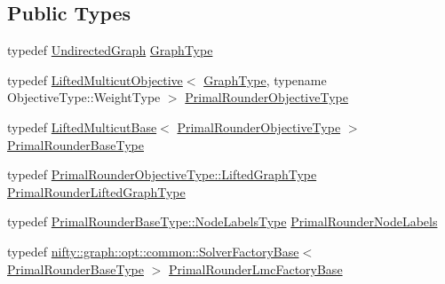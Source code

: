 \subsection*{Public Types}
\begin{DoxyCompactItemize}
\item 
typedef \hyperlink{classnifty_1_1graph_1_1UndirectedGraph}{Undirected\+Graph} \hyperlink{structnifty_1_1graph_1_1opt_1_1lifted__multicut_1_1LiftedMulticutMp_1_1LiftedRounder_ab554fdcb105127764221d744665a12fc}{Graph\+Type}
\item 
typedef \hyperlink{classnifty_1_1graph_1_1opt_1_1lifted__multicut_1_1LiftedMulticutObjective}{Lifted\+Multicut\+Objective}$<$ \hyperlink{structnifty_1_1graph_1_1opt_1_1lifted__multicut_1_1LiftedMulticutMp_1_1LiftedRounder_ab554fdcb105127764221d744665a12fc}{Graph\+Type}, typename Objective\+Type\+::\+Weight\+Type $>$ \hyperlink{structnifty_1_1graph_1_1opt_1_1lifted__multicut_1_1LiftedMulticutMp_1_1LiftedRounder_aba77dfcceab7f0a4a92e6875c9807605}{Primal\+Rounder\+Objective\+Type}
\item 
typedef \hyperlink{classnifty_1_1graph_1_1opt_1_1lifted__multicut_1_1LiftedMulticutBase}{Lifted\+Multicut\+Base}$<$ \hyperlink{structnifty_1_1graph_1_1opt_1_1lifted__multicut_1_1LiftedMulticutMp_1_1LiftedRounder_aba77dfcceab7f0a4a92e6875c9807605}{Primal\+Rounder\+Objective\+Type} $>$ \hyperlink{structnifty_1_1graph_1_1opt_1_1lifted__multicut_1_1LiftedMulticutMp_1_1LiftedRounder_a4f36e999999e10b1a2c4a78d724ee847}{Primal\+Rounder\+Base\+Type}
\item 
typedef \hyperlink{classnifty_1_1graph_1_1opt_1_1lifted__multicut_1_1LiftedMulticutObjective_aec5a5f52c2226c545ca883394fd95a9c}{Primal\+Rounder\+Objective\+Type\+::\+Lifted\+Graph\+Type} \hyperlink{structnifty_1_1graph_1_1opt_1_1lifted__multicut_1_1LiftedMulticutMp_1_1LiftedRounder_a38f30577dd1d5ec834fabb297cd97f70}{Primal\+Rounder\+Lifted\+Graph\+Type}
\item 
typedef \hyperlink{classnifty_1_1graph_1_1opt_1_1common_1_1SolverBase_abefd51561de2fd009f6bed6bef6009ea}{Primal\+Rounder\+Base\+Type\+::\+Node\+Labels\+Type} \hyperlink{structnifty_1_1graph_1_1opt_1_1lifted__multicut_1_1LiftedMulticutMp_1_1LiftedRounder_ab6b004c812de6e59bf80574a15ad9043}{Primal\+Rounder\+Node\+Labels}
\item 
typedef \hyperlink{classnifty_1_1graph_1_1opt_1_1common_1_1SolverFactoryBase}{nifty\+::graph\+::opt\+::common\+::\+Solver\+Factory\+Base}$<$ \hyperlink{structnifty_1_1graph_1_1opt_1_1lifted__multicut_1_1LiftedMulticutMp_1_1LiftedRounder_a4f36e999999e10b1a2c4a78d724ee847}{Primal\+Rounder\+Base\+Type} $>$ \hyperlink{structnifty_1_1graph_1_1opt_1_1lifted__multicut_1_1LiftedMulticutMp_1_1LiftedRounder_a0b0e44f6ebf431a6776874d27243c11d}{Primal\+Rounder\+Lmc\+Factory\+Base}
\end{DoxyCompactItemize}
